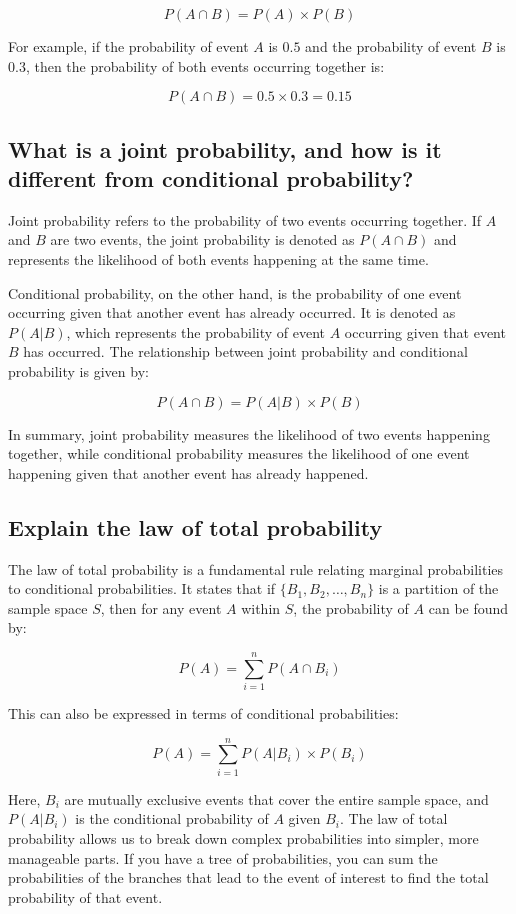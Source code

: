 \documentclass[12pt]{article}
\begin{document}
\[ P(A \cap B) = P(A) \times P(B) \]

For example, if the probability of event \(A\) is \(0.5\) and the probability of event \(B\) is \(0.3\), then the probability of both events occurring together is:

\[ P(A \cap B) = 0.5 \times 0.3 = 0.15 \]

\subsection{What is a joint probability, and how is it different from conditional probability?}
Joint probability refers to the probability of two events occurring together. If \(A\) and \(B\) are two events, the joint probability is denoted as \(P(A \cap B)\) and represents the likelihood of both events happening at the same time.

Conditional probability, on the other hand, is the probability of one event occurring given that another event has already occurred. It is denoted as \(P(A|B)\), which represents the probability of event \(A\) occurring given that event \(B\) has occurred. The relationship between joint probability and conditional probability is given by:

\[ P(A \cap B) = P(A|B) \times P(B) \]

In summary, joint probability measures the likelihood of two events happening together, while conditional probability measures the likelihood of one event happening given that another event has already happened.

\subsection{Explain the law of total probability}
The law of total probability is a fundamental rule relating marginal probabilities to conditional probabilities. It states that if \(\{B_1, B_2, \ldots, B_n\}\) is a partition of the sample space \(S\), then for any event \(A\) within \(S\), the probability of \(A\) can be found by:

\[ P(A) = \sum_{i=1}^{n} P(A \cap B_i) \]

This can also be expressed in terms of conditional probabilities:

\[ P(A) = \sum_{i=1}^{n} P(A|B_i) \times P(B_i) \]

Here, \(B_i\) are mutually exclusive events that cover the entire sample space, and \(P(A|B_i)\) is the conditional probability of \(A\) given \(B_i\). The law of total probability allows us to break down complex probabilities into simpler, more manageable parts. If you have a tree of probabilities, you can sum the probabilities of the branches that lead to the event of interest to find the total probability of that event.
\end{document}
